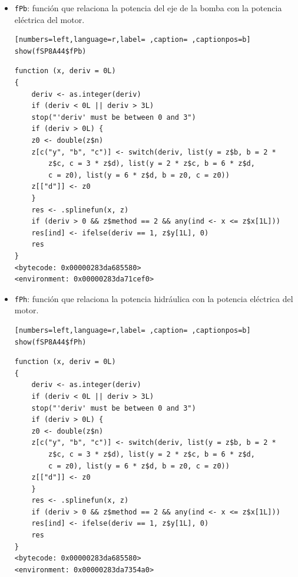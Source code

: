 \begin{itemize}
\begin{itemize}
\begin{verbatim}
function (x, deriv = 0L) 
{
    deriv <- as.integer(deriv)
    if (deriv < 0L || deriv > 3L) 
	stop("'deriv' must be between 0 and 3")
    if (deriv > 0L) {
	z0 <- double(z$n)
	z[c("y", "b", "c")] <- switch(deriv, list(y = z$b, b = 2 * 
	    z$c, c = 3 * z$d), list(y = 2 * z$c, b = 6 * z$d, 
	    c = z0), list(y = 6 * z$d, b = z0, c = z0))
	z[["d"]] <- z0
    }
    res <- .splinefun(x, z)
    if (deriv > 0 && z$method == 2 && any(ind <- x <= z$x[1L])) 
	res[ind] <- ifelse(deriv == 1, z$y[1L], 0)
    res
}
<bytecode: 0x00000283da685580>
<environment: 0x00000283da686240>
\end{verbatim}

\item \texttt{fPb}: función que relaciona la potencia del eje de la bomba con la potencia eléctrica del motor.
\begin{lstlisting}[numbers=left,language=r,label= ,caption= ,captionpos=b]
show(fSP8A44$fPb)
\end{lstlisting}

\begin{verbatim}
function (x, deriv = 0L) 
{
    deriv <- as.integer(deriv)
    if (deriv < 0L || deriv > 3L) 
	stop("'deriv' must be between 0 and 3")
    if (deriv > 0L) {
	z0 <- double(z$n)
	z[c("y", "b", "c")] <- switch(deriv, list(y = z$b, b = 2 * 
	    z$c, c = 3 * z$d), list(y = 2 * z$c, b = 6 * z$d, 
	    c = z0), list(y = 6 * z$d, b = z0, c = z0))
	z[["d"]] <- z0
    }
    res <- .splinefun(x, z)
    if (deriv > 0 && z$method == 2 && any(ind <- x <= z$x[1L])) 
	res[ind] <- ifelse(deriv == 1, z$y[1L], 0)
    res
}
<bytecode: 0x00000283da685580>
<environment: 0x00000283da71cef0>
\end{verbatim}

\item \texttt{fPh}: función que relaciona la potencia hidráulica con la potencia eléctrica del motor.
\begin{lstlisting}[numbers=left,language=r,label= ,caption= ,captionpos=b]
show(fSP8A44$fPh)
\end{lstlisting}

\begin{verbatim}
function (x, deriv = 0L) 
{
    deriv <- as.integer(deriv)
    if (deriv < 0L || deriv > 3L) 
	stop("'deriv' must be between 0 and 3")
    if (deriv > 0L) {
	z0 <- double(z$n)
	z[c("y", "b", "c")] <- switch(deriv, list(y = z$b, b = 2 * 
	    z$c, c = 3 * z$d), list(y = 2 * z$c, b = 6 * z$d, 
	    c = z0), list(y = 6 * z$d, b = z0, c = z0))
	z[["d"]] <- z0
    }
    res <- .splinefun(x, z)
    if (deriv > 0 && z$method == 2 && any(ind <- x <= z$x[1L])) 
	res[ind] <- ifelse(deriv == 1, z$y[1L], 0)
    res
}
<bytecode: 0x00000283da685580>
<environment: 0x00000283da7354a0>
\end{verbatim}


\end{itemize}
\end{itemize}
